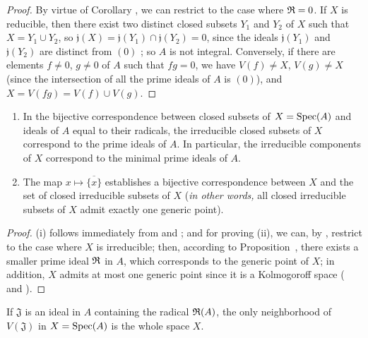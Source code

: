 \begin{proof}
\label{proof-1.1.1.13}
By virtue of Corollary , we can restrict to the case where $\mathfrak{R}=0$.
If $X$ is reducible, then there exist two distinct closed subsets $Y_1$ and $Y_2$ of $X$ such that $X=Y_1\cup Y_2$, so $\mathfrak{j}(X)=\mathfrak{j}(Y_1)\cap\mathfrak{j}(Y_2)=0$, since the ideals $\mathfrak{j}(Y_1)$ and $\mathfrak{j}(Y_2)$ are distinct from $(0)$ ;
so $A$ is not integral.
Conversely, if there are elements $f\neq 0$, $g\neq 0$ of $A$ such that $fg=0$, we have $V(f)\neq X$, $V(g)\neq X$ (since the intersection of all the prime ideals of $A$ is $(0)$), and $X=V(fg)=V(f)\cup V(g)$.
\end{proof}

\begin{corollary}[1.1.14]
\label{1.1.1.14}
\medskip\noindent
\begin{enumerate}
  \item[{\rm(i)}] In the bijective correspondence between closed subsets of $X=\operatorname{Spec}(A)$ and ideals of $A$ equal to their radicals, the irreducible closed subsets of $X$ correspond to the prime ideals of $A$.
    In particular, the irreducible components of $X$ correspond to the minimal prime ideals of $A$.
  \item[{\rm(ii)}] The map $x\mapsto\overline{\{x\}}$ establishes a bijective correspondence between $X$ and the set of closed irreducible subsets of $X$ (\emph{in other words,} all closed irreducible subsets of $X$ admit exactly one generic point).
\end{enumerate}
\end{corollary}

\begin{proof}
\label{proof-1.1.1.14}
(i) follows immediately from  and ;
and for proving (ii), we can, by , restrict to the case where $X$ is irreducible;
then, according to Proposition~, there exists a smaller prime ideal $\mathfrak{R}$ in $A$, which corresponds to the generic point
of $X$;
in addition, $X$ admits at most one generic point since it is a Kolmogoroff space ( and ).
\end{proof}

\begin{proposition}[1.1.15]
\label{1.1.1.15}
If $\mathfrak{J}$ is an ideal in $A$ containing the radical $\mathfrak{R}(A)$, the only
neighborhood of $V(\mathfrak{J})$ in $X=\operatorname{Spec}(A)$ is the whole space $X$.
\end{proposition}

